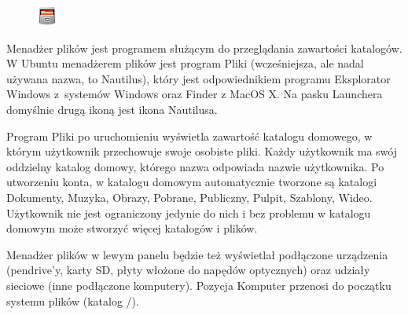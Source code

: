\begin{figure}
	\vspace{-10pt}
	\includegraphics[width=\linewidth]{images/ikony_pliki.png}
\end{figure}

Menadżer plików jest programem służącym do przeglądania zawartości katalogów. W Ubuntu menadżerem plików jest program  \textcolor{ubuntu_orange}{Pliki} (wcześniejsza, ale nadal używana nazwa, to \textcolor{ubuntu_orange}{Nautilus}), który jest odpowiednikiem programu \textcolor{ubuntu_orange}{Eksplorator Windows} z~systemów Windows oraz \textcolor{ubuntu_orange}{Finder} z MacOS X. Na pasku Launchera domyślnie drugą ikoną jest ikona Nautilusa. 

Program Pliki po uruchomieniu wyświetla zawartość katalogu domowego, w którym użytkownik przechowuje swoje osobiste pliki. Każdy użytkownik ma swój oddzielny katalog domowy, którego nazwa odpowiada nazwie użytkownika. Po utworzeniu konta, w katalogu domowym automatycznie tworzone są katalogi Dokumenty, Muzyka, Obrazy, Pobrane, Publiczny, Pulpit, Szablony, Wideo. Użytkownik nie jest ograniczony jedynie do nich i bez problemu w katalogu domowym może stworzyć więcej katalogów i plików.

Menadżer plików w lewym panelu będzie też wyświetlał podłączone urządzenia (pendrive'y, karty SD, płyty włożone do napędów optycznych) oraz udziały sieciowe (inne podłączone komputery). Pozycja \textcolor{ubuntu_orange}{Komputer} przenosi do początku systemu plików (katalog /).

